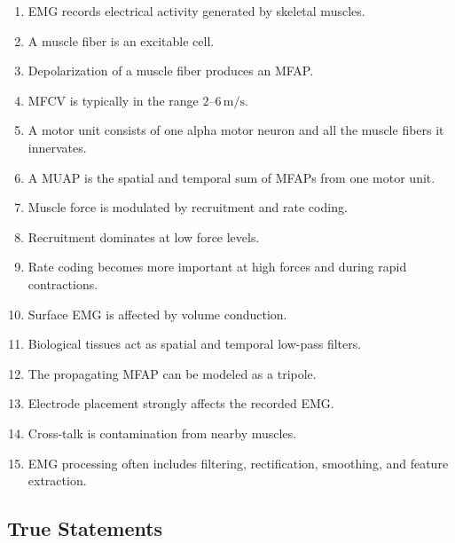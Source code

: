 \begin{enumerate}
    \item EMG records electrical activity generated by skeletal muscles.
    \item A muscle fiber is an excitable cell.
    \item Depolarization of a muscle fiber produces an MFAP.
    \item MFCV is typically in the range $2$--$6\,\text{m/s}$.
    \item A motor unit consists of one alpha motor neuron and all the muscle fibers it innervates.
    \item A MUAP is the spatial and temporal sum of MFAPs from one motor unit.
    \item Muscle force is modulated by recruitment and rate coding.
    \item Recruitment dominates at low force levels.
    \item Rate coding becomes more important at high forces and during rapid contractions.
    \item Surface EMG is affected by volume conduction.
    \item Biological tissues act as spatial and temporal low-pass filters.
    \item The propagating MFAP can be modeled as a tripole.
    \item Electrode placement strongly affects the recorded EMG.
    \item Cross-talk is contamination from nearby muscles.
    \item EMG processing often includes filtering, rectification, smoothing, and feature extraction.
\end{enumerate}

\subsection{True Statements}


